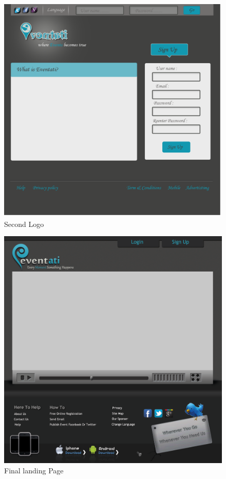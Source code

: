 \documentclass[12pt,a4paper,class,twoside,openany]{report}
\begin{document}
{\begin{figure}
	\begin{minipage}[b]{0.5\linewidth}
	\centering
	\includegraphics[width=\textwidth]{6-7}
	\caption{Second Logo}
	\label{fg:6-7}
	\end{minipage}
	\end{figure}
\begin{figure}
\begin{center}
\includegraphics[height=5.5 in]{6-8}
\caption{Final landing Page}
\label{fg:6-8}
\end{center}
\end{figure}
}
\end{document}
